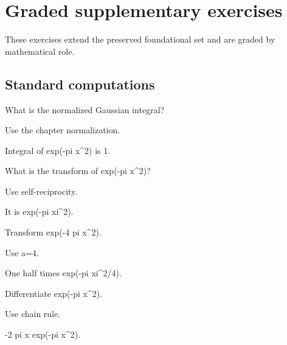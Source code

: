 \section{Graded supplementary exercises}
These exercises extend the preserved foundational set and are graded by mathematical role.

\subsection*{Standard computations}

\begin{exercise}\label{exr:iii12-expand-01}
What is the normalized Gaussian integral?
\end{exercise}
\begin{hint}
Use the chapter normalization.
\end{hint}
\begin{solution}
Integral of exp(-pi x\textasciicircum{}2) is 1.
\end{solution}

\begin{exercise}\label{exr:iii12-expand-02}
What is the transform of exp(-pi x\textasciicircum{}2)?
\end{exercise}
\begin{hint}
Use self-reciprocity.
\end{hint}
\begin{solution}
It is exp(-pi xi\textasciicircum{}2).
\end{solution}

\begin{exercise}\label{exr:iii12-expand-03}
Transform exp(-4 pi x\textasciicircum{}2).
\end{exercise}
\begin{hint}
Use a=4.
\end{hint}
\begin{solution}
One half times exp(-pi xi\textasciicircum{}2/4).
\end{solution}

\begin{exercise}[Derivative]\label{exr:iii12-expand-04}
Differentiate exp(-pi x\textasciicircum{}2).
\end{exercise}
\begin{hint}
Use chain rule.
\end{hint}
\begin{solution}
-2 pi x exp(-pi x\textasciicircum{}2).
\end{solution}

